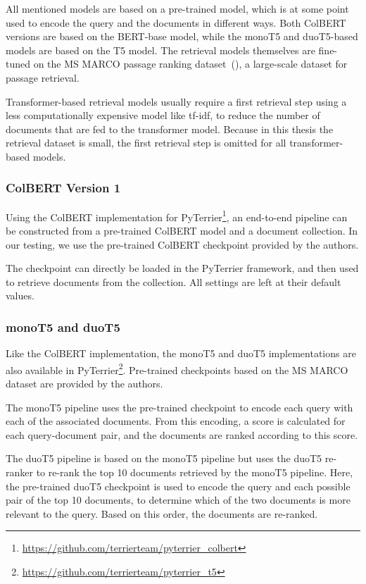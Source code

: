 All mentioned models are based on a pre-trained model, which is at some point used to encode the query and the documents in different ways.
Both ColBERT versions are based on the BERT-base model, while the monoT5 and duoT5-based models are based on the T5 model.
The retrieval models themselves are fine-tuned on the MS MARCO passage ranking dataset~(\cite{bajaj:2016:MSMARCO}), a large-scale dataset for passage retrieval.

Transformer-based retrieval models usually require a first retrieval step using a less computationally expensive model like tf-idf, to reduce the number of documents that are fed to the transformer model.
Because in this thesis the retrieval dataset is small, the first retrieval step is omitted for all transformer-based models.

\subsubsection{ColBERT Version 1}
Using the ColBERT implementation for PyTerrier\footnote{\url{https://github.com/terrierteam/pyterrier_colbert}}, an end-to-end pipeline can be constructed from a pre-trained ColBERT model and a document collection.
In our testing, we use the pre-trained ColBERT checkpoint provided by the authors.

The checkpoint can directly be loaded in the PyTerrier framework, and then used to retrieve documents from the collection.
All settings are left at their default values.

\subsubsection{monoT5 and duoT5}
Like the ColBERT implementation, the monoT5 and duoT5 implementations are also available in PyTerrier\footnote{\url{https://github.com/terrierteam/pyterrier_t5}}.
Pre-trained checkpoints based on the MS MARCO dataset are provided by the authors.

The monoT5 pipeline uses the pre-trained checkpoint to encode each query with each of the associated documents.
From this encoding, a score is calculated for each query-document pair, and the documents are ranked according to this score.

The duoT5 pipeline is based on the monoT5 pipeline but uses the duoT5 re-ranker to re-rank the top 10 documents retrieved by the monoT5 pipeline.
Here, the pre-trained duoT5 checkpoint is used to encode the query and each possible pair of the top 10 documents, to determine which of the two documents is more relevant to the query.
Based on this order, the documents are re-ranked.

